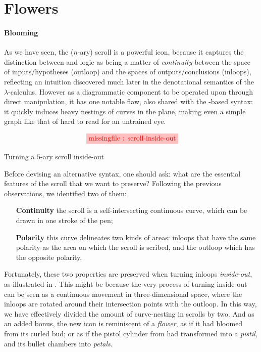 \section{Flowers}

\paragraph{Blooming}

As we have seen, the ($n$-ary) scroll is a powerful icon, because it captures
the distinction between  and  logic as being a matter of
\emph{continuity} between the space of inputs/hypotheses (outloop) and the
spaces of outputs/conclusions (inloops), reflecting an intuition discovered much
later in the denotational semantics of the $\lambda$-calculus. However as a
diagrammatic component to be operated upon through direct manipulation, it has
one notable flaw, also shared with the  -based syntax: it quickly
induces heavy nestings of curves in the plane, making even a simple graph like
that of  hard to read for an untrained eye.

\begin{marginfigure}
  $$
  \tikzfig{1}{0.4}{scroll-inside-out}
  $$
  \caption{Turning a $5$-ary scroll inside-out}
\end{marginfigure}

Before devising an alternative syntax, one should ask: what are the essential
features of the scroll that we want to preserve? Following the previous
observations, we identified two of them:
\begin{itemize}
  \item[\textbf{Continuity}] the scroll is a self-intersecting continuous curve,
  which can be drawn in one stroke of the pen;
  \item[\textbf{Polarity}] this curve delineates two kinds of areas: inloops that have
  the same polarity as the area on which the scroll is scribed, and the outloop
  which has the opposite polarity.
\end{itemize}

Fortunately, these two properties are preserved when turning inloops
\emph{inside-out}, as illustrated in . This might be
because the very process of turning inside-out can be seen as a continuous
movement in three-dimensional space, where the inloops are rotated around their
intersection points with the outloop. In this way, we have effectively divided
the amount of curve-nesting in scrolls by two. And as an added bonus, the new
icon is reminiscent of a \emph{flower}, as if it had bloomed from its curled
bud; or as if the pistol cylinder from  had transformed into
a \emph{pistil}, and its bullet chambers into \emph{petals}.

